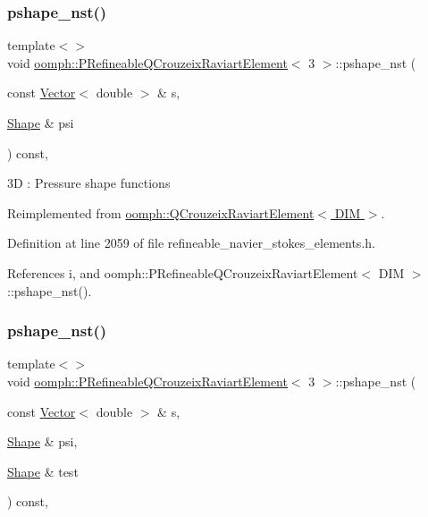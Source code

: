 \subsubsection{\texorpdfstring{pshape\+\_\+nst()}{pshape\_nst()}\hspace{0.1cm}{\footnotesize\ttfamily [5/6]}}
{\footnotesize\ttfamily template$<$$>$ \\
void \hyperlink{classoomph_1_1PRefineableQCrouzeixRaviartElement}{oomph\+::\+P\+Refineable\+Q\+Crouzeix\+Raviart\+Element}$<$ 3 $>$\+::pshape\+\_\+nst (\begin{DoxyParamCaption}\item[{const \hyperlink{classoomph_1_1Vector}{Vector}$<$ double $>$ \&}]{s,  }\item[{\hyperlink{classoomph_1_1Shape}{Shape} \&}]{psi }\end{DoxyParamCaption}) const\hspace{0.3cm}{\ttfamily [inline]}, {\ttfamily [virtual]}}

3D \+: Pressure shape functions 

Reimplemented from \hyperlink{classoomph_1_1QCrouzeixRaviartElement_a122c4b7ae47df08a07acd2f1ed6f61b0}{oomph\+::\+Q\+Crouzeix\+Raviart\+Element$<$ D\+I\+M $>$}.



Definition at line 2059 of file refineable\+\_\+navier\+\_\+stokes\+\_\+elements.\+h.



References i, and oomph\+::\+P\+Refineable\+Q\+Crouzeix\+Raviart\+Element$<$ D\+I\+M $>$\+::pshape\+\_\+nst().

\mbox{\label{classoomph_1_1PRefineableQCrouzeixRaviartElement_acf1d5e8b3dc66e12bff22d73d06ea4d6}} 
\subsubsection{\texorpdfstring{pshape\+\_\+nst()}{pshape\_nst()}\hspace{0.1cm}{\footnotesize\ttfamily [6/6]}}
{\footnotesize\ttfamily template$<$$>$ \\
void \hyperlink{classoomph_1_1PRefineableQCrouzeixRaviartElement}{oomph\+::\+P\+Refineable\+Q\+Crouzeix\+Raviart\+Element}$<$ 3 $>$\+::pshape\+\_\+nst (\begin{DoxyParamCaption}\item[{const \hyperlink{classoomph_1_1Vector}{Vector}$<$ double $>$ \&}]{s,  }\item[{\hyperlink{classoomph_1_1Shape}{Shape} \&}]{psi,  }\item[{\hyperlink{classoomph_1_1Shape}{Shape} \&}]{test }\end{DoxyParamCaption}) const\hspace{0.3cm}{\ttfamily [inline]}, {\ttfamily [virtual]}}



